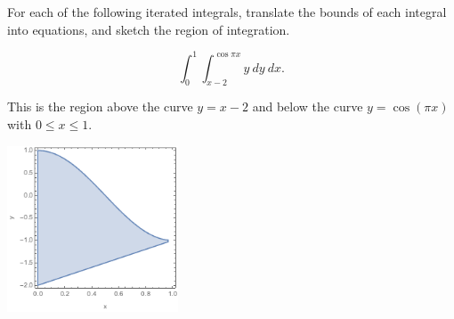 \documentclass[12pt,letterpaper,noanswers]{exam}
\begin{document}
\begin{questions}



\item For each of the following iterated integrals, translate the bounds of each integral into equations, and sketch the region of integration.
\begin{parts}
\item  \[\int_0^1\int_{x-2}^{\cos \pi x} y\ dy\ dx.\]
\begin{solution}
 This is the region above the curve $y=x-2$ and below the curve $y=\cos(\pi x)$ with $0\leq x\leq 1$.
 
 \includegraphics[width=2in]{img/HW06_r2.png}


\end{solution}
\end{parts}
\end{questions}
\end{document}
